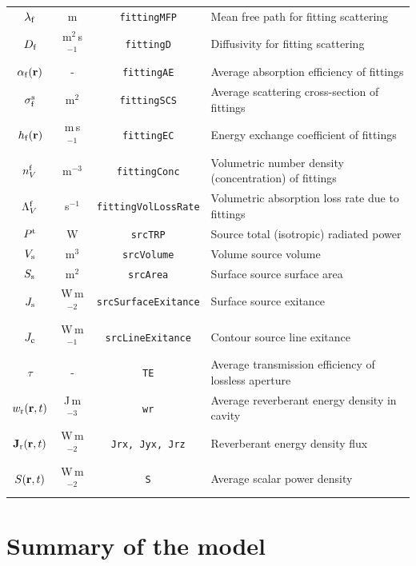 \documentclass[a4paper]{article}
\numberwithin{equation}{section}
\begin{document}
\begin{center}
\begin{supertabular}{|c|c|c|l|}
$\lambda _{\mathrm{f}}$      &m               &\texttt{fittingMFP}         &Mean free path for fitting scattering \\
$D_{\mathrm{f}}$             &m$^2$\,s$^{-1}$ &\texttt{fittingD}           &Diffusivity for fitting scattering \\
$\alpha_{\mathrm{f}}(\boldsymbol{\mathrm{r}})$     &-               &\texttt{fittingAE}          &Average absorption efficiency of fittings \\
$\sigma_{\mathrm{f}}^{\mathrm{s}}$    &m$^2$           &\texttt{fittingSCS}         &Average scattering cross-section of fittings \\
$h_{\mathrm{f}}(\boldsymbol{\mathrm{r}})$          &m\,s$^{-1}$     &\texttt{fittingEC}          &Energy exchange coefficient of fittings \\
$n_V^{\mathrm{f}}$           &m$^{-3}$        &\texttt{fittingConc}        &Volumetric number density (concentration) of fittings \\
$\Lambda_V^{\mathrm{f}}$     &s$^{-1}$        &\texttt{fittingVolLossRate} &Volumetric absorption loss rate due to fittings \\
$P^{\mathrm{t}}$             &W               &\texttt{srcTRP}             &Source total (isotropic) radiated power \\
$V_{\mathrm{s}}$             &m$^3$           &\texttt{srcVolume}          &Volume source volume \\
$S_{\mathrm{s}}$             &m$^2$           &\texttt{srcArea}            &Surface source surface area \\
$J_{\mathrm{s}}$             &W\,m$^{-2}$     &\texttt{srcSurfaceExitance} &Surface source exitance \\
$J_{\mathrm{c}}$             &W\,m$^{-1}$     &\texttt{srcLineExitance}    &Contour source line exitance \\
$\tau$              &-               &\texttt{TE}                 &Average transmission efficiency of lossless aperture \\
$w_{\mathrm{r}}(\boldsymbol{\mathrm{r}},t)$         &J\,m$^{-3}$     &\texttt{wr}                 &Average reverberant energy density in cavity \\
$\boldsymbol{\mathrm{J}}_{\mathrm{r}}(\boldsymbol{\mathrm{r}},t)$       &W\,m$^{-2}$     &\texttt{Jrx, Jyx, Jrz}      &Reverberant energy density flux \\
$S(\boldsymbol{\mathrm{r}},t)$             &W\,m$^{-2}$     &\texttt{S}                  &Average scalar power density \\
\hline
\end{supertabular}
\end{center}

\newpage

\section[Summary of the model]{Summary of the model}
\label{sc:sum}
\end{document}
